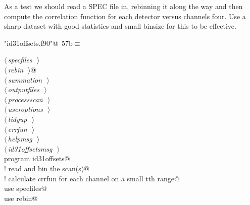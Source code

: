 \documentclass[10pt,a4paper,notitlepage]{article}
\begin{document}
As a test we should read a SPEC file in, rebinning it along the way and 
then compute the correlation function for each detector versus channels four.
Use a sharp dataset with good statistics and small binsize for this
to be effective. 

\begin{flushleft} \small\label{scrap62}\raggedright\small
{} \verb@"id31offsets.f90"@\nobreak\ {\footnotesize {57b}}$\equiv$
\vspace{-1ex}
\begin{list}{}{} \item
\mbox{}\verb@@\hbox{$\langle\,${\it specfiles}\nobreak\ {\footnotesize {}}$\,\rangle$}\verb@@\\
\mbox{}\verb@@\hbox{$\langle\,${\it rebin}\nobreak\ {\footnotesize {}}$\,\rangle$}\verb@ @\\
\mbox{}\verb@@\hbox{$\langle\,${\it summation}\nobreak\ {\footnotesize {}}$\,\rangle$}\verb@@\\
\mbox{}\verb@@\hbox{$\langle\,${\it outputfiles}\nobreak\ {\footnotesize {}}$\,\rangle$}\verb@@\\
\mbox{}\verb@@\hbox{$\langle\,${\it processscan}\nobreak\ {\footnotesize {}}$\,\rangle$}\verb@@\\
\mbox{}\verb@@\hbox{$\langle\,${\it useroptions}\nobreak\ {\footnotesize {}}$\,\rangle$}\verb@@\\
\mbox{}\verb@@\hbox{$\langle\,${\it tidyup}\nobreak\ {\footnotesize {}}$\,\rangle$}\verb@@\\
\mbox{}\verb@@\hbox{$\langle\,${\it crrfun}\nobreak\ {\footnotesize {}}$\,\rangle$}\verb@@\\
\mbox{}\verb@@\hbox{$\langle\,${\it helpmsg}\nobreak\ {\footnotesize {}}$\,\rangle$}\verb@@\\
\mbox{}\verb@@\hbox{$\langle\,${\it id31offsetsmsg}\nobreak\ {\footnotesize {}}$\,\rangle$}\verb@@\\
\mbox{}\verb@      program id31offsets@\\
\mbox{}\verb@      ! read and bin the scan(s)@\\
\mbox{}\verb@      ! calculate crrfun for each channel on a small tth range@\\
\mbox{}\verb@      use specfiles@\\
\mbox{}\verb@      use rebin@\\

\end{list}
\end{flushleft}
\end{document}
